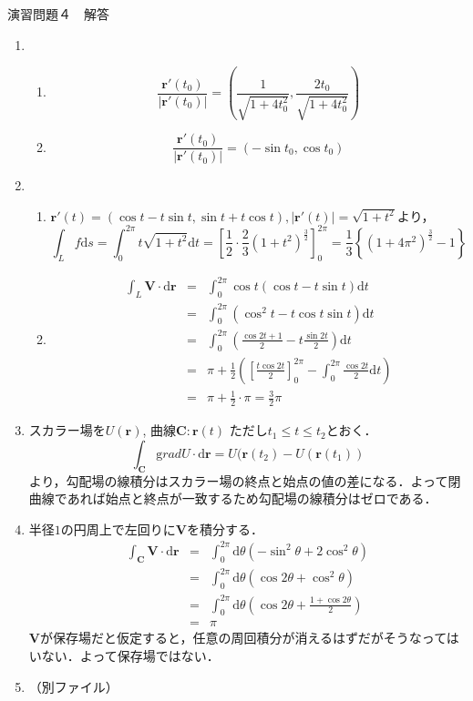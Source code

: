 \documentclass{jarticle}
\def\d{\mathrm d}
\def\grad{\mathrm grad}
\begin{document}
\newpage

\begin{center} {\Large 演習問題４　解答} \end{center}
  \begin{enumerate}
    \item
      \begin{enumerate}
        \item
          \[\frac {\bm r'(t_0)}{|\bm r'(t_0)|} = (\frac{1}{\sqrt{1+4t_0^2}}, \frac{2t_0}{\sqrt{1+4t_0^2}})\]
        \item
          \[\frac {\bm r'(t_0)}{|\bm r'(t_0)|} = (-\sin t_0, \cos t_0) \]
      \end{enumerate}
    \item
      \begin{enumerate}
        \item
          $\bm r'(t) = (\cos t - t \sin t, \sin t + t \cos t),|\bm r'(t)| = \sqrt{1+t^2}$より，
          \[ \int_L f \d s = \int_0^{2\pi} t \sqrt{1+t^2} \d t = \left[ \frac{1}{2} \cdot \frac{2}{3}  (1+t^2)^\frac{3}{2} \right]_0^{2\pi} = \frac{1}{3} \left\{ (1+4\pi^2)^\frac{3}{2} - 1 \right\} \]
        \item
          \begin{eqnarray*} 
            \int_L \bm V \cdot \d \bm{r} & = & \int_0^{2\pi} \cos t ( \cos t - t \sin t ) \d t \\
            & = & \int_0^{2\pi} ( \cos^2 t - t \cos t \sin t ) \d t  \\
            & = & \int_0^{2\pi} \left( \frac{\cos 2t + 1}{2} - t \frac{\sin 2t}{2} \right) \d t \\
            & = & \pi + \frac{1}{2} \left( \left[ \frac{t \cos 2t}{2} \right]_0^{2\pi} - \int_0^{2\pi} \frac{\cos 2t}{2} \d t \right)\\
            & = &  \pi + \frac{1}{2} \cdot \pi = \frac{3}{2} \pi 
          \end{eqnarray*}
      \end{enumerate}
    \item
      スカラー場を$U(\bm r)$, 曲線$\bm C: \bm r(t)$ ただし$t_1 \leq t \leq t_2$とおく．
      \[ \int_{\bm C} \grad U \cdot \d \bm{r}  = U(\bm r(t_2) - U(\bm r(t_1)) \]
      より，勾配場の線積分はスカラー場の終点と始点の値の差になる．よって閉曲線であれば始点と終点が一致するため勾配場の線積分はゼロである．
    \item
      半径$1$の円周上で左回りに$\bm V$を積分する．
      \begin{eqnarray*} 
        \int_{\bm C} \bm V \cdot \d \bm r & = & \int_0^{2\pi} \d \theta ( - \sin^2 \theta + 2 \cos^2 \theta ) \\
        & = & \int_0^{2\pi} \d \theta ( \cos 2\theta + \cos^2 \theta) \\
        & = & \int_0^{2\pi} \d \theta \left( \cos 2\theta + \frac{1+\cos 2\theta}{2} \right) \\
        & = & \pi
      \end{eqnarray*}
      $\bm V$が保存場だと仮定すると，任意の周回積分が消えるはずだがそうなってはいない．よって保存場ではない．
    \item（別ファイル）


\end{enumerate}
\end{document}
